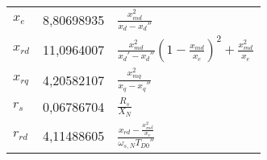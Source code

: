 \begin{longtable}[]{@{}lll@{}}
\begin{minipage}[t]{0.11\columnwidth}\raggedright
\(x_e\)\strut
\end{minipage} & \begin{minipage}[t]{0.24\columnwidth}\raggedright
8,80698935\strut
\end{minipage} & \begin{minipage}[t]{0.56\columnwidth}\raggedright
\(\frac{x_{md}^2}{x_d-x_d''}\)\strut
\end{minipage}\tabularnewline
\begin{minipage}[t]{0.11\columnwidth}\raggedright
\(x_{rd}\)\strut
\end{minipage} & \begin{minipage}[t]{0.24\columnwidth}\raggedright
11,0964007\strut
\end{minipage} & \begin{minipage}[t]{0.56\columnwidth}\raggedright
\(\frac{x_{md}^2}{x_d'-x_d''}(1-\frac{x_{md}}{x_e})^2+\frac{x_{md}^2}{x_e}\)\strut
\end{minipage}\tabularnewline
\begin{minipage}[t]{0.11\columnwidth}\raggedright
\(x_{rq}\)\strut
\end{minipage} & \begin{minipage}[t]{0.24\columnwidth}\raggedright
4,20582107\strut
\end{minipage} & \begin{minipage}[t]{0.56\columnwidth}\raggedright
\(\frac{x_{mq}^2}{x_q-x_q''}\)\strut
\end{minipage}\tabularnewline
\begin{minipage}[t]{0.11\columnwidth}\raggedright
\(r_s\)\strut
\end{minipage} & \begin{minipage}[t]{0.24\columnwidth}\raggedright
0,06786704\strut
\end{minipage} & \begin{minipage}[t]{0.56\columnwidth}\raggedright
\(\frac{R_s}{X_N}\)\strut
\end{minipage}\tabularnewline
\begin{minipage}[t]{0.11\columnwidth}\raggedright
\(r_{rd}\)\strut
\end{minipage} & \begin{minipage}[t]{0.24\columnwidth}\raggedright
4,11488605\strut
\end{minipage} & \begin{minipage}[t]{0.56\columnwidth}\raggedright
\(\frac{x_{rd}-\frac{x_{md}^2}{x_e}}{\omega_{s,N}T_{D0}''}\)\strut

\end{minipage}
\end{longtable}
